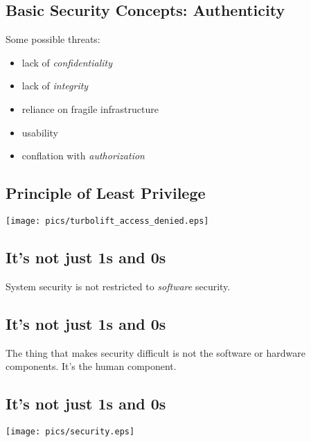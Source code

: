 \documentclass[xga]{xdvislides}
\begin{document}
\subsection{Basic Security Concepts: Authenticity}
Some possible threats:
\begin{itemize}
	\item lack of {\em confidentiality}
	\item lack of {\em integrity}
	\item reliance on fragile infrastructure
	\item usability
	\item conflation with {\em authorization}
\end{itemize}

\subsection{Principle of Least Privilege}
\vspace*{\fill}
\begin{center}
	\texttt{[image: pics/turbolift\_access\_denied.eps]}
\end{center}
\vspace*{\fill}

\subsection{It's not just 1s and 0s}
\vspace{.5in}
\Huge
\begin{center}
System security is not restricted to {\em software} security.
\end{center}
\Normalsize

\subsection{It's not just 1s and 0s}
\vspace{.5in}
\Huge
\begin{center}
The thing that makes security difficult is not the software or hardware
components.  It's the human component.
\end{center}
\Normalsize

\subsection{It's not just 1s and 0s}
\vspace*{\fill}
\begin{center}
	\texttt{[image: pics/security.eps]}
\end{center}
\vspace*{\fill}
\end{document}
